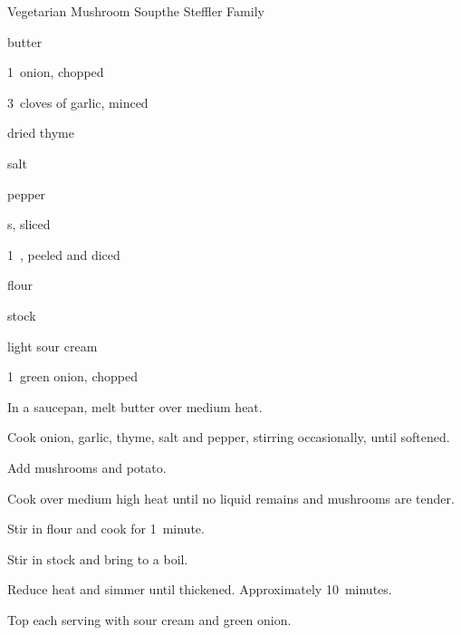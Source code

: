 \begin{recipe}{Vegetarian Mushroom Soup}{the Steffler Family}{}

\begin{ingredients}
\item {} butter
\item 1~onion, chopped
\item 3~cloves of garlic, minced
\item \tp{\half} dried thyme
\item \tp{\quarter} salt
\item \tp{\quarter} pepper
\item {} s, sliced
\item 1~, peeled and diced
\item \C{\quarter} flour
\item {} stock
\item \C{\quarter} light sour cream
\item 1~green onion, chopped
\end{ingredients}

\begin{directions}
\item In a saucepan, melt butter over medium heat.
\item Cook onion, garlic, thyme, salt and pepper, stirring occasionally, until softened.
\item Add mushrooms and potato.
\item Cook over medium high heat until no liquid remains and mushrooms are tender.
\item Stir in flour and cook for 1~minute.
\item Stir in stock and bring to a boil.
\item Reduce heat and simmer until thickened. Approximately 10~minutes.
\item Top each serving with sour cream and green onion.
\end{directions}
\end{recipe}
